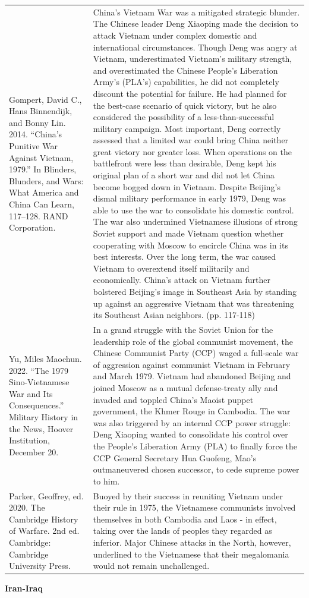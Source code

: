 {\begin{longtable}{p{}p{}}
\\
Gompert, David C., Hans Binnendijk, and Bonny Lin. 2014. “China's Punitive War Against Vietnam, 1979.” In Blinders, Blunders, and Wars: What America and China Can Learn, 117–128. RAND Corporation. & China's Vietnam War was a mitigated strategic blunder. The Chinese leader Deng Xiaoping made the decision to attack Vietnam under complex domestic and international circumstances. Though Deng was angry at Vietnam, underestimated Vietnam's military strength, and overestimated the Chinese People's Liberation Army's (PLA's) capabilities, he did not completely discount the potential for failure. He had planned for the best-case scenario of quick victory, but he also considered the possibility of a less-than-successful military campaign. Most important, Deng correctly assessed that a limited war could bring China neither great victory nor greater loss. When operations on the battlefront were less than desirable, Deng kept his original plan of a short war and did not let China become bogged down in Vietnam. Despite Beijing's dismal military performance in early 1979, Deng was able to use the war to consolidate his domestic control. The war also undermined Vietnamese illusions of strong Soviet support and made Vietnam question whether cooperating with Moscow to encircle China was in its best interests. Over the long term, the war caused Vietnam to overextend itself militarily and economically. China's attack on Vietnam further bolstered Beijing's image in Southeast Asia by standing up against an aggressive Vietnam that was threatening its Southeast Asian neighbors. (pp. 117-118)
\\
Yu, Miles Maochun. 2022. “The 1979 Sino-Vietnamese War and Its Consequences.” Military History in the News, Hoover Institution, December 20. & In a grand struggle with the Soviet Union for the leadership role of the global communist movement, the Chinese Communist Party (CCP) waged a full-scale war of aggression against communist Vietnam in February and March 1979. Vietnam had abandoned Beijing and joined Moscow as a mutual defense-treaty ally and invaded and toppled China's Maoist puppet government, the Khmer Rouge in Cambodia. The war was also triggered by an internal CCP power struggle: Deng Xiaoping wanted to consolidate his control over the People's Liberation Army (PLA) to finally force the CCP General Secretary Hua Guofeng, Mao's outmaneuvered chosen successor, to cede supreme power to him.
\\
Parker, Geoffrey, ed. 2020. The Cambridge History of Warfare. 2nd ed. Cambridge: Cambridge University Press. & Buoyed by their success in reuniting Vietnam under their rule in 1975, the Vietnamese communists involved themselves in both Cambodia and Laos - in effect, taking over the lands of peoples they regarded as inferior. Major Chinese attacks in the North, however, underlined to the Vietnamese that their megalomania would not remain unchallenged.
\\
\end{longtable}}
\clearpage
         \textbf{Iran-Iraq} 

